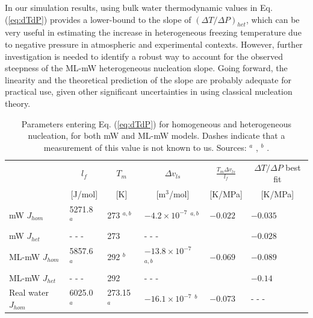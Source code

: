 \documentclass[journal abbreviation, manuscript]{copernicus}
\begin{document}
In our simulation results, using bulk water thermodynamic values in Eq. (\ref{eq:dTdP}) provides a lower-bound to the slope of $(\Delta T/\Delta P)_{het}$, which can be very useful in estimating the increase in heterogeneous freezing temperature due to negative pressure in atmospheric and experimental contexts. However, further investigation is needed to identify a robust way to account for the observed steepness of the ML-mW heterogeneous nucleation slope. Going forward, the linearity and the theoretical prediction of the slope are probably adequate for practical use, given other significant uncertainties in using classical nucleation theory. 



\begin{table}
\caption{\label{tab:slopes} Parameters entering Eq. (\ref{eq:dTdP}) for homogeneous and heterogeneous nucleation, for both mW and ML-mW models. Dashes indicate that a measurement of this value is not known to us. Sources: $^a$ \citet{chan2019}, $^b$ \citet{rosky2022}.}
\begin{tabular}{ |p{2.60cm}||p{2.2cm}|p{2.2cm}|p{2.2cm}|p{2.2cm}|p{2.5cm}|  }
 \hline
 & \multicolumn{1}{|c|}{$l_f$}  
 & \multicolumn{1}{|c|}{$T_m$}
 & \multicolumn{1}{|c|}{$\Delta v_{ls}$}
 & \multicolumn{1}{|c|}{$\frac{T_m \Delta v_{ls}}{l_f}$ } 
 & \multicolumn{1}{|c|}{$\Delta T/ \Delta P$ best fit }\\
 & \multicolumn{1}{|c|}{[J/mol] }  
 & \multicolumn{1}{|c|}{[K] }
 & \multicolumn{1}{|c|}{[m$^3$/mol]  }        
 & \multicolumn{1}{|c|}{[K/MPa] }                           
 & \multicolumn{1}{|c|}{[K/MPa] }\\
 \hline
 mW $J_{hom}$   & 5271.8 $^a$           & 273 $^{a,b}$  &  $-4.2 \times 10^{-7}$ $^{a,b}$     & $-0.022$    & $-0.035$ \\
 mW $J_{het}$   & - - -   & 273           & - - -   &           & $-0.028$ \\
 ML-mW $J_{hom}$ & 5857.6 $^a$           & 292 $^b$      & $-13.8 \times 10^{-7}$ $^{a,b}$     & $-0.069$    & $-0.089$ \\
 ML-mW $J_{het}$ & - - -   & 292           & - - -   &           & $-0.14$ \\
 Real water $J_{hom}$ & 6025.0 $^a$     & 273.15 $^a$   & $-16.1 \times 10^{-7}$ $^{b}$       & $-0.073$    & - - - \\
 \hline
\end{tabular}
\end{table}
\end{document}
